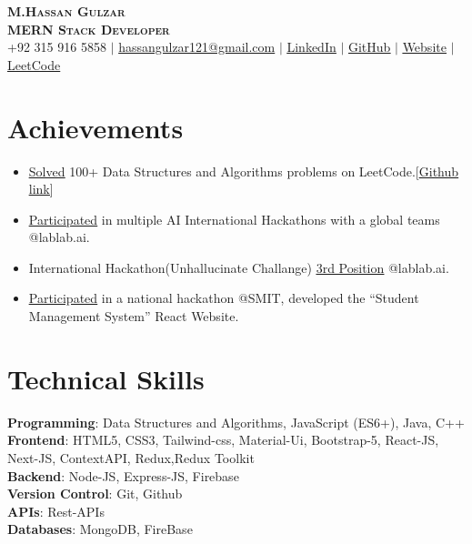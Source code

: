 \documentclass[letterpaper,11pt]{article}
\newcommand{\resumeItem}[1]{
  \item\small{
    {#1 \vspace{-2pt}}
  }
}
\newcommand{\resumeItemListStart}{\begin{itemize}}
\newcommand{\resumeItemListEnd}{\end{itemize}\vspace{-5pt}}
\begin{document}
\begin{center}
    \textbf{\Huge \scshape M.Hassan Gulzar} \\ \vspace{1pt}
    \textbf{\small \scshape MERN Stack Developer} \\ \vspace{5pt}
  \small +92 315 916 5858 $|$
  \href{mailto:hassangulzar121@gmail.com}{hassangulzar121@gmail.com}  $|$
  \href{https://www.linkedin.com/in/hassan-gulzar-256292267/}{\underline{LinkedIn}} $|$
  \href{https://github.com/hassangulzar1}{\underline{GitHub}} $|$
  \href{https://hassan-gulzar.vercel.app/}{\underline{Website}} $|$
  \href{https://leetcode.com/M_HassanGulzar/}{\underline{LeetCode}}
\end{center}

\section{Achievements}
\resumeItemListStart
\resumeItem{{\href{https://leetcode.com/M_HassanGulzar/}{\underline{Solved}}} 100+ Data Structures and Algorithms problems on LeetCode.[{\href{https://github.com/hassangulzar1/Learning-DSA}{\underline{Github link}}}]}
\resumeItem{{\href{https://lablab.ai/u/@hassangulzar1926}{\underline{Participated}}} in multiple AI International Hackathons with a global teams @lablab.ai.}
\resumeItem{International Hackathon(Unhallucinate Challange) {\href{https://www.linkedin.com/posts/hassan-gulzar-256292267_hackathon-hackathonwinner-startup-activity-7176665274249560064-KLsP?utm_source=share&utm_medium=member_desktop}{\underline{3rd Position}}} @lablab.ai.}
\resumeItem{{\href{https://github.com/hassangulzar1/student-managment-system}{\underline{Participated}}} in a national hackathon @SMIT, developed the “Student Management System” React Website.}

\resumeItemListEnd

\section{Technical Skills}
\begin{itemize}[leftmargin=0.15in, label={}]
  \small{\item{
        \textbf{Programming}{: Data Structures and Algorithms, JavaScript (ES6+), Java, C++} \\
        \textbf{Frontend}{: HTML5, CSS3, Tailwind-css, Material-Ui, Bootstrap-5, React-JS, Next-JS,   ContextAPI, Redux,Redux Toolkit} \\
        \textbf{Backend}{: Node-JS, Express-JS, Firebase} \\
        \textbf{Version Control}{: Git, Github} \\
        \textbf{APIs}{: Rest-APIs} \\
        \textbf{Databases}{: MongoDB, FireBase}\\
        }}
\end{itemize}
%
\end{document}
